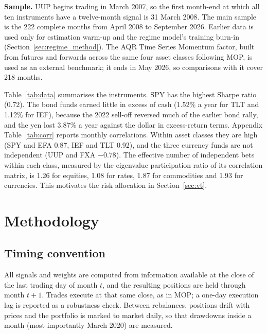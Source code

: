 \documentclass[11pt,a4paper]{article}
\begin{document}
\textbf{Sample.} UUP begins trading in March 2007, so the first month-end at which all ten instruments have a twelve-month signal is 31 March 2008. The main sample is the 222 complete months from April 2008 to September 2026. Earlier data is used only for estimation warm-up and the regime model's training burn-in (Section~\ref{sec:regime_method}). The AQR Time Series Momentum factor, built from futures and forwards across the same four asset classes following MOP, is used as an external benchmark; it ends in May 2026, so comparisons with it cover 218 months.

Table~\ref{tab:data} summarises the instruments. SPY has the highest Sharpe ratio (0.72). The bond funds earned little in excess of cash (1.52\% a year for TLT and 1.12\% for IEF), because the 2022 sell-off reversed much of the earlier bond rally, and the yen lost 3.87\% a year against the dollar in excess-return terms. Appendix Table~\ref{tab:corr} reports monthly correlations. Within asset classes they are high (SPY and EFA 0.87, IEF and TLT 0.92), and the three currency funds are not independent (UUP and FXA $-0.78$). The effective number of independent bets within each class, measured by the eigenvalue participation ratio of its correlation matrix, is 1.26 for equities, 1.08 for rates, 1.87 for commodities and 1.93 for currencies. This motivates the risk allocation in Section~\ref{sec:vt}.

\begin{table}[!htbp]
\centering
\caption{Instruments, April 2008 to September 2026 (222 months). Annualised mean and volatility of monthly excess returns over the T-bill rate; the Sharpe ratio is their ratio. Skewness and worst month are for monthly returns.}
\label{tab:data}
\small

\end{table}

\section{Methodology}
\label{sec:method}

\subsection{Timing convention}

All signals and weights are computed from information available at the close of the last trading day of month $t$, and the resulting positions are held through month $t+1$. Trades execute at that same close, as in MOP; a one-day execution lag is reported as a robustness check. Between rebalances, positions drift with prices and the portfolio is marked to market daily, so that drawdowns inside a month (most importantly March 2020) are measured.
\end{document}

